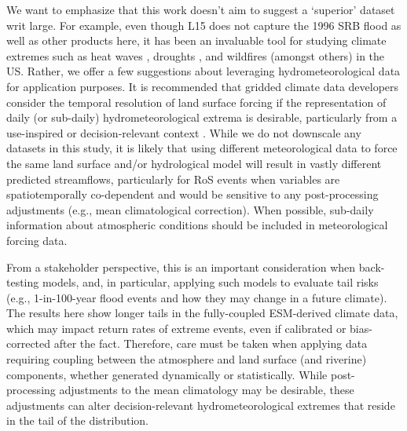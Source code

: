 \documentclass[nhess, manuscript]{copernicus}
\begin{document}
We want to emphasize that this work doesn't aim to suggest a `superior' dataset writ large. For example, even though L15 does not capture the 1996 SRB flood as well as other products here, it has been an invaluable tool for studying climate extremes such as heat waves \citep{mazdiyasni2015substantial}, droughts \citep{pendergrass2020flash,williams2020large}, and wildfires \citep{williams2019observed} (amongst others) in the US.
Rather, we offer a few suggestions about leveraging hydrometeorological data for application purposes.
It is recommended that gridded climate data developers consider the temporal resolution of land surface forcing if the representation of daily (or sub-daily) hydrometeorological extrema is desirable, particularly from a use-inspired or decision-relevant context \citep{Jagannathan2021}.
While we do not downscale any datasets in this study, it is likely that using different meteorological data to force the same land surface and/or hydrological model will result in vastly different predicted streamflows, particularly for RoS events when variables are spatiotemporally co-dependent and would be sensitive to any post-processing adjustments (e.g., mean climatological correction). When possible, sub-daily information about atmospheric conditions should be included in meteorological forcing data.

From a stakeholder perspective, this is an important consideration when back-testing models, and, in particular, applying such models to evaluate tail risks (e.g., 1-in-100-year flood events and how they may change in a future climate).
The results here show longer tails in the fully-coupled ESM-derived climate data, which may impact return rates of extreme events, even if calibrated or bias-corrected after the fact.
Therefore, care must be taken when applying data requiring coupling between the atmosphere and land surface (and riverine) components, whether generated dynamically or statistically.
While post-processing adjustments to the mean climatology may be desirable, these adjustments can alter decision-relevant hydrometeorological extremes that reside in the tail of the distribution.




\end{document}
